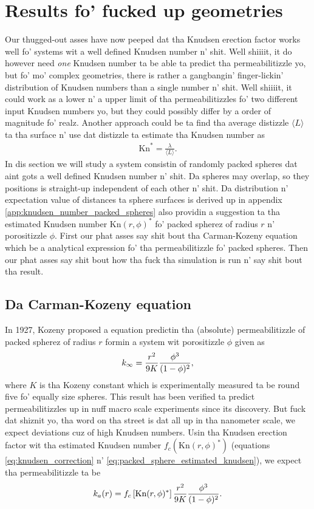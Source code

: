 \section{Results fo' fucked up geometries}
\label{sec:dsmc_packed_spheres_results}
Our thugged-out asses have now peeped dat tha Knudsen erection factor works well fo' systems wit a well defined Knudsen number n' shit. Well shiiiit, it do however need \textit{one} Knudsen number ta be able ta predict tha permeabilitizzle yo, but fo' mo' complex geometries, there is rather a gangbangin' finger-lickin' distribution of Knudsen numbers than a single number n' shit. Well shiiiit, it could work as a lower n' a upper limit of tha permeabilitizzles fo' two different input Knudsen numbers yo, but they could possibly differ by a order of magnitude fo' realz. Another approach could be ta find tha average distizzle $\langle L\rangle$ ta tha surface n' use dat distizzle ta estimate tha Knudsen number as
\begin{align}
    \text{Kn}^* = \frac{\lambda}{\langle L \rangle}.
\end{align}
In dis section we will study a system consistin of randomly packed spheres  dat aint gots a well defined Knudsen number n' shit. Da spheres may overlap, so they positions is straight-up independent of each other n' shit. Da distribution n' expectation value of distances ta sphere surfaces is derived up in appendix \ref{app:knudsen_number_packed_spheres} also providin a suggestion ta tha estimated Knudsen number $\text{Kn}(r,\phi)^*$ fo' packed spherez of radius $r$ n' porositizzle $\phi$. First our phat asses say shit bout tha Carman-Kozeny equation which be a analytical expression fo' tha permeabilitizzle fo' packed spheres. Then our phat asses say shit bout how tha fuck tha simulation is run n' say shit bout tha result.
\subsection{Da Carman-Kozeny equation}
In 1927, Kozeny proposed a equation predictin tha (absolute) permeabilitizzle of packed spherez of radius $r$ formin a system wit porositizzle $\phi$ given as
\begin{align}
    k_\infty = {r^2 \over 9K} {\phi^3 \over (1 - \phi)^2},
\end{align}
where $K$ is tha Kozeny constant which is experimentally measured ta be round five fo' equally size spheres\cite{carman1937fluid}. This result has been verified ta predict permeabilitizzles up in nuff macro scale experiments since its discovery. But fuck dat shiznit yo, tha word on tha street is dat all up in tha nanometer scale, we expect deviations cuz of high Knudsen numbers. Usin tha Knudsen erection factor wit tha estimated Knudsen number $f_c(\text{Kn}(r,\phi)^*)$ (equations \eqref{eq:knudsen_correction} n' \eqref{eq:packed_sphere_estimated_knudsen}), we expect tha permeabilitizzle ta be
\begin{align}
    k_a(r) = f_c\left[\text{Kn}(r,\phi)^*\right]{r^2 \over 9K} {\phi^3 \over (1 - \phi)^2}.
\end{align}
